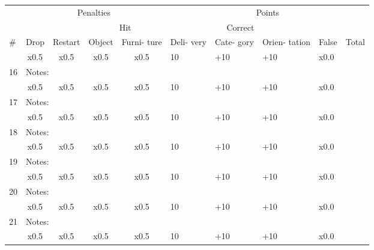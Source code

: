 \documentclass{article}
\begin{document}
\newpage

\begin{center}
\begin{tabular}{|m{0.4cm}|m{0.8cm}|m{1cm}|m{1cm}|m{1.2cm}|m{0.8cm}|m{0.8cm}|m{1cm}|m{0.8cm}|m{0.8cm}|}
    \hline
    &\multicolumn{4}{|c|}{Penalties }& \multicolumn{5}{|c|}{Points }\\
    \cline{2-10}
    & & &\multicolumn{2}{|c|}{Hit}&\multicolumn{3}{|c|}{Correct}& &\\
    \cline{4-5} \cline{6-8}
    \#& Drop& Restart& Object& Furni- ture& Deli- very& Cate- gory& Orien- tation& False& Total \\
    \hline
     & \multicolumn{1}{|c|}{x0.5} & \multicolumn{1}{|c|}{x0.5} & \multicolumn{1}{|c|}{x0.5} & \multicolumn{1}{|c|}{x0.5}& 10& +10& +10& x0.0&\\
    \cline{2-9}
    16 & \multicolumn{8}{|l|}{Notes: }&\\
    \hline
     & \multicolumn{1}{|c|}{x0.5} & \multicolumn{1}{|c|}{x0.5} & \multicolumn{1}{|c|}{x0.5} & \multicolumn{1}{|c|}{x0.5}& 10& +10& +10& x0.0&\\
    \cline{2-9}
    17 & \multicolumn{8}{|l|}{Notes: }&\\
    \hline
     & \multicolumn{1}{|c|}{x0.5} & \multicolumn{1}{|c|}{x0.5} & \multicolumn{1}{|c|}{x0.5} & \multicolumn{1}{|c|}{x0.5}& 10& +10& +10& x0.0&\\
    \cline{2-9}
    18 & \multicolumn{8}{|l|}{Notes: }&\\
    \hline
     & \multicolumn{1}{|c|}{x0.5} & \multicolumn{1}{|c|}{x0.5} & \multicolumn{1}{|c|}{x0.5} & \multicolumn{1}{|c|}{x0.5}& 10& +10& +10& x0.0&\\
    \cline{2-9}
    19 & \multicolumn{8}{|l|}{Notes: }&\\
    \hline
     & \multicolumn{1}{|c|}{x0.5} & \multicolumn{1}{|c|}{x0.5} & \multicolumn{1}{|c|}{x0.5} & \multicolumn{1}{|c|}{x0.5}& 10& +10& +10& x0.0&\\
    \cline{2-9}
    20 & \multicolumn{8}{|l|}{Notes: }&\\
    \hline
     & \multicolumn{1}{|c|}{x0.5} & \multicolumn{1}{|c|}{x0.5} & \multicolumn{1}{|c|}{x0.5} & \multicolumn{1}{|c|}{x0.5}& 10& +10& +10& x0.0&\\
    \cline{2-9}
    21 & \multicolumn{8}{|l|}{Notes: }&\\
    \hline
     & \multicolumn{1}{|c|}{x0.5} & \multicolumn{1}{|c|}{x0.5} & \multicolumn{1}{|c|}{x0.5} & \multicolumn{1}{|c|}{x0.5}& 10& +10& +10& x0.0&\\

\end{tabular}
\end{center}
\end{document}
